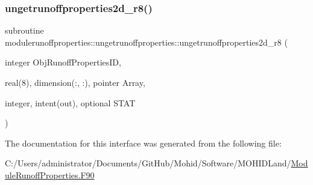 \mbox{\label{interfacemodulerunoffproperties_1_1ungetrunoffproperties_a92b1bb71569541d4cd9525321b8e7282}} 
\subsubsection{\texorpdfstring{ungetrunoffproperties2d\+\_\+r8()}{ungetrunoffproperties2d\_r8()}}
{\footnotesize\ttfamily subroutine modulerunoffproperties\+::ungetrunoffproperties\+::ungetrunoffproperties2d\+\_\+r8 (\begin{DoxyParamCaption}\item[{integer}]{Obj\+Runoff\+Properties\+ID,  }\item[{real(8), dimension(\+:, \+:), pointer}]{Array,  }\item[{integer, intent(out), optional}]{S\+T\+AT }\end{DoxyParamCaption})\hspace{0.3cm}{\ttfamily [private]}}



The documentation for this interface was generated from the following file\+:\begin{DoxyCompactItemize}
\item 
C\+:/\+Users/administrator/\+Documents/\+Git\+Hub/\+Mohid/\+Software/\+M\+O\+H\+I\+D\+Land/\mbox{\hyperlink{_module_runoff_properties_8_f90}{Module\+Runoff\+Properties.\+F90}}\end{DoxyCompactItemize}
